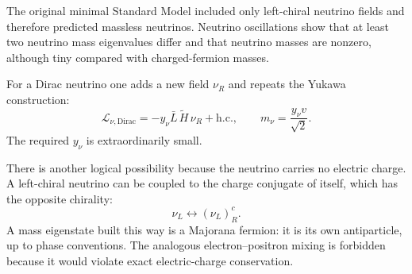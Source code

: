 The original minimal Standard Model included only left-chiral neutrino
fields and therefore predicted massless neutrinos. Neutrino oscillations
show that at least two neutrino mass eigenvalues differ and that neutrino
masses are nonzero, although tiny compared with charged-fermion masses.

\begin{classroomqa}
\end{classroomqa}

For a Dirac neutrino one adds a new field \(\nu_R\) and repeats the Yukawa
construction:
\begin{equation}
  \mathcal L_{\nu,\mathrm{Dirac}}
  =-y_\nu\bar L\,\widetilde H\,\nu_R+\mathrm{h.c.},
  \qquad
  m_\nu=\frac{y_\nu v}{\sqrt2}.
  \label{eq:l09-dirac-neutrino}
\end{equation}
The required \(y_\nu\) is extraordinarily small.

There is another logical possibility because the neutrino carries no
electric charge. A left-chiral neutrino can be coupled to the charge
conjugate of itself, which has the opposite chirality:
\begin{equation}
  \nu_L\longleftrightarrow(\nu_L)^c_R .
  \label{eq:l09-majorana-mixing}
\end{equation}
A mass eigenstate built this way is a Majorana fermion: it is its own
antiparticle, up to phase conventions. The analogous electron--positron
mixing is forbidden because it would violate exact electric-charge
conservation.

\begin{classroomqa}
\end{classroomqa}

